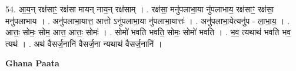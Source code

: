 \documentclass[17pt]{extarticle}
\begin{document}
54. आ॒य॒न् रक्ष॑साꣳ॒॒ रक्ष॑सा मायन् नाय॒न् रक्ष॑साम् । . रक्ष॑सा॒ मनु॑पलाभा॒या नु॑पलाभाय॒ रक्ष॑साꣳ॒॒ रक्ष॑सा॒ मनु॑पलाभाय । . अनु॑पलाभा॒यात्त॒ आत्तो ऽनु॑पलाभा॒या नु॑पलाभा॒यात्तः॑ । . अनु॑पलाभा॒येत्यनु॑प - ला॒भा॒य॒ । . आत्तः॒ सोमः॒ सोम॒ आत्त॒ आत्तः॒ सोमः॑ । . सोमो॑ भवति भवति॒ सोमः॒ सोमो॑ भवति । . भ॒व॒ त्यथाथ॑ भवति भव॒ त्यथ॑ । . अथ॑ वैसर्ज॒नानि॑ वैसर्ज॒ना न्यथाथ॑ वैसर्ज॒नानि॑ । \newline

\textbf{Ghana Paata } \newline
\end{document}
